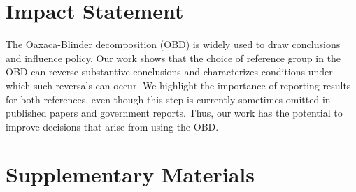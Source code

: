 \documentclass{article}
\theoremstyle{definition}
\begin{document}
\section*{Impact Statement}

The Oaxaca-Blinder decomposition (OBD) is widely used to draw conclusions and influence policy.
Our work shows that the choice of reference group in the OBD can reverse substantive conclusions and characterizes conditions under which such reversals can occur.
We highlight the importance of reporting results for both references, even though this step is currently sometimes omitted in published papers
and government reports.
Thus, our work has the potential to improve decisions that arise from using the OBD.






\clearpage
\appendix
\onecolumn

\section*{Supplementary Materials}




\end{document}
